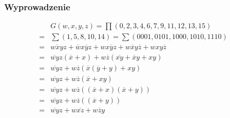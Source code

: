 \documentclass[a4paper,12pt]{extarticle}  %
\begin{document}
\subsubsection{Wyprowadzenie}
\begin{align}
	  & G(w,x,y,z) = \prod(0, 2, 3, 4, 6, 7, 9, 11, 12, 13, 15)                                                       \\
	= & \sum(1,5,8,10,14) = \sum(0001, 0101, 1000, 1010, 1110)                                                        \\
	= & \overline{wxy}z + \overline{w}x\overline{y}z + w\overline{xyz} + w\overline{x}y\overline{z} + wxy\overline{z} \\
	= & \overline{wy}z(\overline{x} + x) + w\overline{z}(\overline{xy} + \overline{x}y + xy)                          \\
	= & \overline{wy}z + w\overline{z}(\overline{x}(\overline{y} + y) + xy)                                           \\
	= & \overline{wy}z + w\overline{z}(\overline{x} + xy)                                                             \\
	= & \overline{wy}z + w\overline{z}((\overline{x} + x)(\overline{x} + y))                                          \\
	= & \overline{wy}z + w\overline{z}((\overline{x} + y))                                                            \\
	= & \overline{wy}z + w\overline{xz} + w\overline{z}y
\end{align}
\end{document}
